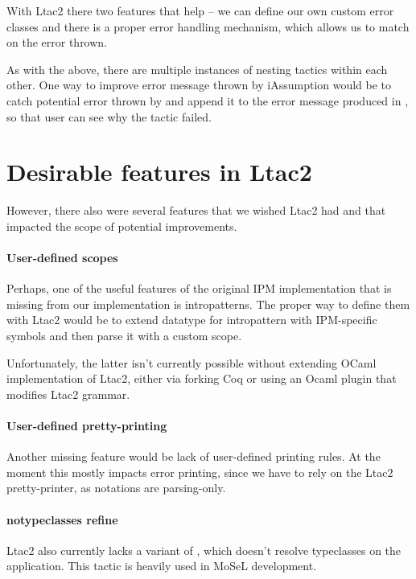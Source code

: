 With Ltac2 there two features that help -- we can define our own custom error classes and there is a proper error handling mechanism, which allows us to match on the error thrown.

As with the  above, there are multiple instances of nesting tactics within each other.
One way to improve error message thrown by iAssumption would be to catch potential error thrown by  and append it to the error message produced in , so that user can see why the tactic failed.

\section{Desirable features in Ltac2}

However, there also were several features that we wished Ltac2 had and that impacted the scope of potential improvements.

\paragraph{User-defined scopes}

Perhaps, one of the useful features of the original IPM implementation that is missing from our implementation is intropatterns.
The proper way to define them with Ltac2 would be to extend datatype for intropattern with IPM-specific symbols and then parse it with a custom scope.

Unfortunately, the latter isn't currently possible without extending OCaml implementation of Ltac2, either via forking Coq or using an Ocaml plugin that modifies Ltac2 grammar.

\paragraph{User-defined pretty-printing}
Another missing feature would be lack of user-defined printing rules.
At the moment this mostly impacts error printing, since we have to rely on the Ltac2 pretty-printer, as notations are parsing-only.

\paragraph{notypeclasses refine}

Ltac2 also currently lacks a variant of , which doesn't resolve typeclasses on the application.
This tactic is heavily used in MoSeL development.

